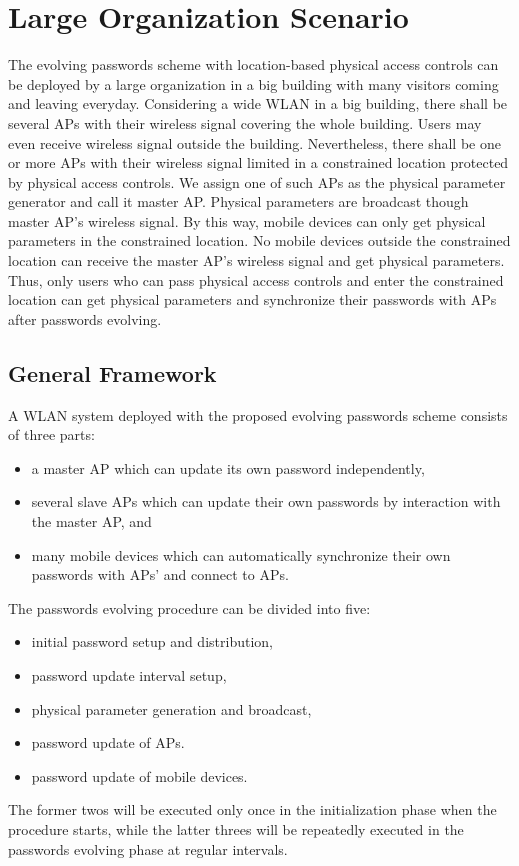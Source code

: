 \section{Large Organization Scenario}
The evolving passwords scheme with location-based physical access controls can be deployed by a large organization in a big building with many visitors coming and leaving everyday. Considering a wide WLAN in a big building, there shall be several APs with their wireless signal covering the whole building. Users may even receive wireless signal outside the building. Nevertheless, there shall be one or more APs with their wireless signal limited in a constrained location protected by physical access controls. We assign one of such APs as the physical parameter generator and call it master AP. Physical parameters are broadcast though master AP’s wireless signal. By this way, mobile devices can only get physical parameters in the constrained location. No mobile devices outside the constrained location can receive the master AP’s wireless signal and get physical parameters. Thus, only users who can pass physical access controls and enter the constrained location can get physical parameters and synchronize their passwords with APs after passwords evolving. 

\subsection{General Framework}
A WLAN system deployed with the proposed evolving passwords scheme consists of three parts: 
\begin{itemize}
	\item a master AP which can update its own password independently, 
	\item several slave APs which can update their own passwords by interaction with the master AP, and 
	\item many mobile devices which can automatically synchronize their own passwords with APs’ and connect to APs. 
\end{itemize}

The passwords evolving procedure can be divided into five: 
\begin{itemize}
	\item initial password setup and distribution, 
	\item password update interval setup, 
	\item physical parameter generation and broadcast, 
	\item password update of APs. 
	\item password update of mobile devices. 
\end{itemize}
The former twos will be executed only once in the initialization phase when the procedure starts, while the latter threes will be repeatedly executed in the passwords evolving phase at regular intervals. 

